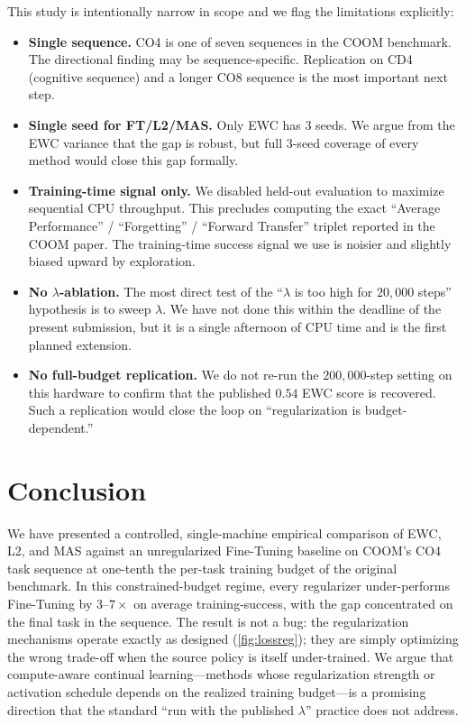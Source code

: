 \documentclass[11pt,a4paper]{article}
\begin{document}
This study is intentionally narrow in scope and we flag the limitations
explicitly:
\begin{itemize}[leftmargin=1.5em,topsep=2pt,itemsep=1pt]
    \item \textbf{Single sequence.} CO4 is one of seven sequences in the
        COOM benchmark. The directional finding may be sequence-specific.
        Replication on CD4 (cognitive sequence) and a longer CO8 sequence
        is the most important next step.
    \item \textbf{Single seed for FT/L2/MAS.} Only EWC has $3$ seeds. We
        argue from the EWC variance that the gap is robust, but full
        $3$-seed coverage of every method would close this gap formally.
    \item \textbf{Training-time signal only.} We disabled
        held-out evaluation to maximize sequential CPU throughput.
        This precludes computing the exact ``Average Performance'' /
        ``Forgetting'' / ``Forward Transfer'' triplet reported in the COOM
        paper. The training-time success signal we use is noisier and
        slightly biased upward by exploration.
    \item \textbf{No $\lambda$-ablation.} The most direct test of the
        ``$\lambda$ is too high for $20{,}000$ steps'' hypothesis is to
        sweep $\lambda$. We have not done this within the deadline of the
        present submission, but it is a single afternoon of CPU time and
        is the first planned extension.
    \item \textbf{No full-budget replication.} We do not re-run the
        $200{,}000$-step setting on this hardware to confirm that the
        published $0.54$ EWC score is recovered. Such a replication
        would close the loop on ``regularization is budget-dependent.''
\end{itemize}

\section{Conclusion}
\label{sec:concl}

We have presented a controlled, single-machine empirical comparison of
EWC, L2, and MAS against an unregularized Fine-Tuning baseline on COOM's
CO4 task sequence at one-tenth the per-task training budget of the
original benchmark. In this constrained-budget regime, every regularizer
under-performs Fine-Tuning by $3$--$7\times$ on average training-success,
with the gap concentrated on the final task in the sequence. The result is
not a bug: the regularization mechanisms operate exactly as designed
(\cref{fig:lossreg}); they are simply optimizing the wrong trade-off when
the source policy is itself under-trained. We argue that compute-aware
continual learning---methods whose regularization strength or activation
schedule depends on the realized training budget---is a promising direction
that the standard ``run with the published $\lambda$'' practice does not
address.



\end{document}
